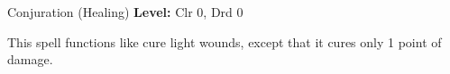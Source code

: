 {Conjuration (Healing)}
{
	\textbf{Level:}
	Clr 0, Drd 0\\
}
{
	This spell functions like cure light wounds, except that it cures only 1 point of damage.

}
